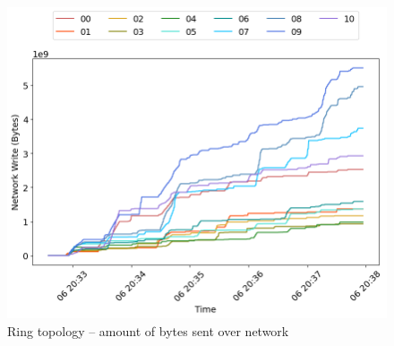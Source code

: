\begin{minipage}{0.5\linewidth}
\begin{figure}[H]
\captionsetup{justification=centering,width=0.8\linewidth}
\includegraphics[width=\linewidth]{figures/ring/net_write.png}
\caption{Ring topology -- amount of bytes sent over network}
\label{fig:ring-net_write}
\end{figure}
\end{minipage}

